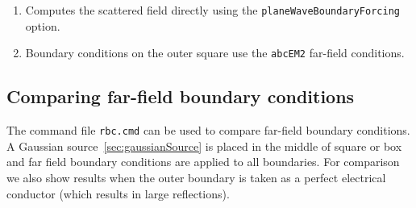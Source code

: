 \begin{enumerate}
  \item Computes the scattered field directly using the {\tt planeWaveBoundaryForcing} option.
  \item Boundary conditions on the outer square use the {\tt abcEM2} far-field conditions.
\end{enumerate}


\clearpage
\subsection{Comparing far-field boundary conditions} \label{sec:compareFarField}

The command file {\tt rbc.cmd} can be used to compare far-field boundary conditions.
A Gaussian source~\ref{sec:gaussianSource} is placed in the middle of square or box and far field boundary 
conditions are applied to all boundaries. For comparison we also show results when the outer boundary
is taken as a perfect electrical conductor (which results in large reflections).

